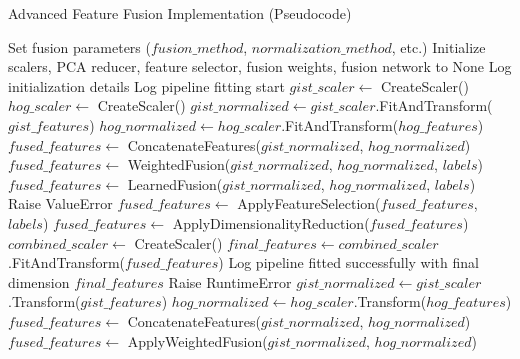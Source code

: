 \begin{algorithm}[!htbp]
\caption{Advanced Feature Fusion Implementation (Pseudocode)}
\label{alg:feature-fusion}
\begin{algorithmic}[1]
    \State Set fusion parameters ($fusion\_method$, $normalization\_method$, etc.)
    \State Initialize scalers, PCA reducer, feature selector, fusion weights, fusion network to None
    \State Log initialization details
\EndProcedure
\Statex
{}
    \State Log pipeline fitting start
    \State $gist\_scaler \leftarrow$ CreateScaler()
    \State $hog\_scaler \leftarrow$ CreateScaler()
    \State $gist\_normalized \leftarrow gist\_scaler$.FitAndTransform($gist\_features$)
    \State $hog\_normalized \leftarrow hog\_scaler$.FitAndTransform($hog\_features$)
        \State $fused\_features \leftarrow$ ConcatenateFeatures($gist\_normalized$, $hog\_normalized$)
        \State $fused\_features \leftarrow$ WeightedFusion($gist\_normalized$, $hog\_normalized$, $labels$)
        \State $fused\_features \leftarrow$ LearnedFusion($gist\_normalized$, $hog\_normalized$, $labels$)
    \Else
        \State Raise ValueError
    \EndIf
        \State $fused\_features \leftarrow$ ApplyFeatureSelection($fused\_features$, $labels$)
    \EndIf
        \State $fused\_features \leftarrow$ ApplyDimensionalityReduction($fused\_features$)
    \EndIf
    \State $combined\_scaler \leftarrow$ CreateScaler()
    \State $final\_features \leftarrow combined\_scaler$.FitAndTransform($fused\_features$)
    \State Log pipeline fitted successfully with final dimension
    \Return $final\_features$
\EndProcedure
\Statex
{}
     \State Raise RuntimeError \EndIf
    \State $gist\_normalized \leftarrow gist\_scaler$.Transform($gist\_features$)
    \State $hog\_normalized \leftarrow hog\_scaler$.Transform($hog\_features$)
        \State $fused\_features \leftarrow$ ConcatenateFeatures($gist\_normalized$, $hog\_normalized$)
        \State $fused\_features \leftarrow$ ApplyWeightedFusion($gist\_normalized$, $hog\_normalized$)

\end{algorithmic}
\end{algorithm}
